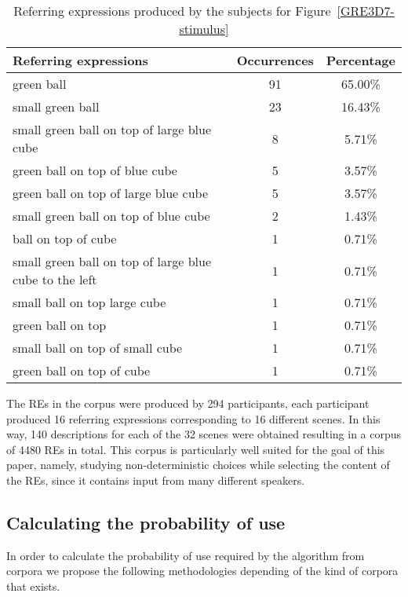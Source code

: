 \begin{table}[h!]
\begin{center}
\begin{tabular}{|l|c|c|}
\hline
Referring expressions & Occurrences & Percentage \\
\hline
green ball & 91 & 65.00\% \\
small green ball & 23 & 16.43\% \\
small green ball on top of large blue cube & 8 & 5.71\% \\
green ball on top of blue cube & 5 & 3.57\% \\
green ball on top of large blue cube & 5 & 3.57\% \\
small green ball on top of blue cube & 2 & 1.43\% \\
ball on top of cube & 1 & 0.71\% \\
small green ball on top of large blue cube to the left & 1 & 0.71\% \\
small ball on top large cube & 1 & 0.71\% \\
green ball on top & 1 & 0.71\% \\
small ball on top of small cube & 1 & 0.71\% \\
green ball on top of cube & 1 & 0.71\% \\
\hline
\end{tabular}
\caption{Referring expressions produced by the subjects for Figure~\ref{GRE3D7-stimulus}\label{corpus-distribution}}
\end{center}
\end{table}

The REs in the corpus were produced by 294 participants, each participant produced 16 referring expressions corresponding to 16 different scenes. In this way, 140 descriptions for each of the 32 scenes were obtained resulting in a corpus of 4480 REs in total. This corpus is particularly well suited for the goal of this paper, namely, studying non-deterministic choices while selecting the content of the REs, since it contains input from many different speakers. 


\subsection{Calculating the probability of use}

In order to calculate the probability of use required by the algorithm from corpora we propose the following methodologies depending of the kind of corpora that exists.

